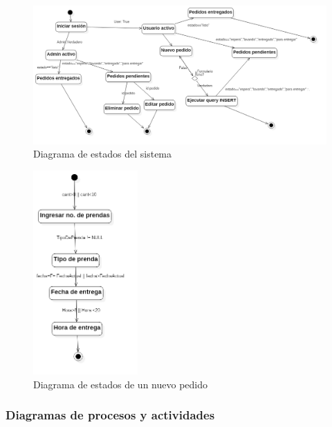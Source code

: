 \begin{figure}[htb]
\begin{center}
\includegraphics[width=17cm]{./imagenes/diagramas/Estado_lavanderia.png}
\end{center}
\caption{Diagrama de estados del sistema}
\end{figure}


\begin{figure}[htb]
\begin{center}
\includegraphics[width=4cm]{./imagenes/diagramas/Estados_lavanderia2.png}
\end{center}
\caption{Diagrama de estados de un nuevo pedido}
\end{figure}



\newpage

\subsubsection{Diagramas de procesos y actividades}


